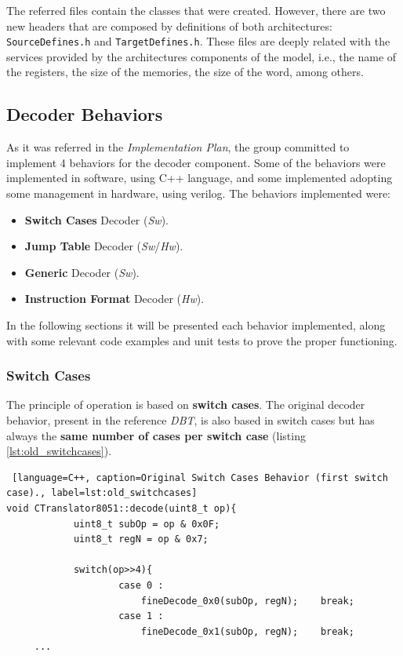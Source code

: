 \documentclass[12pt]{article}
\begin{document}
{The referred files contain the classes that were created. However, there are two new headers that are composed by definitions of both architectures: \texttt{SourceDefines.h} and \texttt{TargetDefines.h}. These files are deeply related with the services provided by the architectures components of the model, i.e., the name of the registers, the size of the memories, the size of the word, among others. 



\subsection{Decoder Behaviors}
As it was referred in the \textit{Implementation Plan},  the group committed to implement 4 behaviors for the decoder component. Some of the behaviors were implemented in software, using C++ language, and some implemented adopting some management in hardware, using verilog. The behaviors implemented were:

\begin{itemize}
	\item \textbf{Switch Cases} Decoder (\textit{Sw}).
    \item \textbf{Jump Table} Decoder (\textit{Sw}/\textit{Hw}).
    \item \textbf{Generic} Decoder (\textit{Sw}).
    \item \textbf{Instruction Format} Decoder (\textit{Hw}).
\end{itemize}

In the following sections it will be presented each behavior implemented, along with some relevant code examples and unit tests to prove the proper functioning.


\subsubsection{Switch Cases}
The principle of operation is based on \textbf{switch cases}.
The original decoder behavior, present in the reference \textit{DBT}, is also based in switch cases but has always the \textbf{same number of cases per switch case} (listing \ref{lst:old_switchcases}).

\begin{lstlisting} [language=C++, caption=Original Switch Cases Behavior (first switch case)., label=lst:old_switchcases]
void CTranslator8051::decode(uint8_t op){
			uint8_t subOp = op & 0x0F;
			uint8_t regN = op & 0x7;	

			switch(op>>4){
					case 0 :
						fineDecode_0x0(subOp, regN);	break;
					case 1 :
						fineDecode_0x1(subOp, regN);	break; 
     ...   
\end{lstlisting}

}
\end{document}
